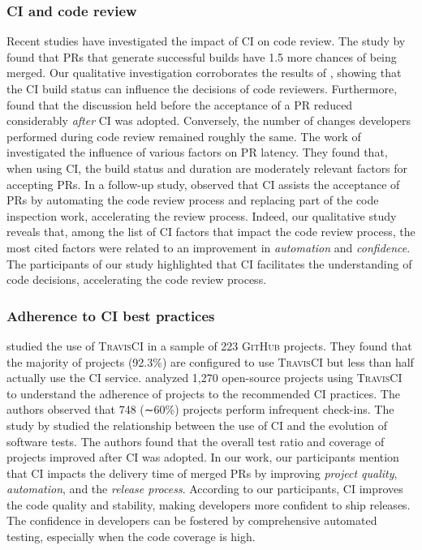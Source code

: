 \subsubsection*{\textbf{CI and code review}}

Recent studies have investigated the impact of CI on code review. The study by \cite{zampetti2019study} 
found that PRs that generate successful builds have 1.5 more chances of being merged. Our qualitative investigation corroborates the results of \cite{zampetti2019study}, showing that the CI build status can influence the decisions of code reviewers. Furthermore, \cite{cassee2020silent} found that the discussion held before the acceptance of a PR reduced considerably \textit{after} CI was adopted. Conversely, the number of changes developers performed during code review remained roughly the same. The work of \cite{zhang2022a_pull_latency} investigated the influence of various factors on PR latency. They found that, when using CI, the build status and duration are moderately relevant factors for accepting PRs. In a follow-up study, \cite{zhang2022b_pull_decision} observed that CI assists the acceptance of PRs by automating the code review process and replacing part of the code inspection work, accelerating the review process.
Indeed, our qualitative study reveals that, among the list of CI factors that impact the code review process, the most cited factors were related to an improvement in \textit{automation} and \textit{confidence}.
The participants of our study highlighted that CI facilitates the understanding of code decisions, accelerating the code review process. 

\subsubsection*{\textbf{Adherence to CI best practices}}

\cite{Vasilescu2015-tj} studied the use of \textsc{TravisCI} in a sample of 223 \textsc{GitHub} projects.
They found that the majority of projects (92.3\%) are configured to use \textsc{TravisCI} but less than half actually use the CI service. \cite{felidre2019continuous} analyzed 1,270 open-source projects using \textsc{TravisCI} to understand the adherence of projects to the recommended CI practices. 
The authors observed that 748 (∼60\%) projects perform infrequent check-ins. The study by \cite{nery2019empirical} studied the relationship between the use of CI and the evolution of software tests. The authors found that the overall test ratio and coverage of projects improved after CI was adopted.
In our work, our participants mention that CI impacts the delivery time of merged PRs by improving \textit{project quality}, \textit{automation}, and the \textit{release process}. According to our participants, CI improves the code quality and stability, making developers more confident to ship releases. The confidence in developers can be fostered by comprehensive automated testing, especially when the code coverage is high.

